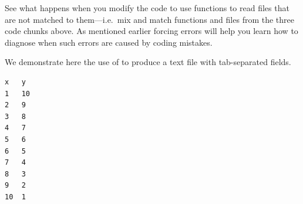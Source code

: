 \documentclass[krantz2]{krantz}\usepackage{knitr}%
\begin{document}
\begin{playground}
See what happens when you modify the code to use  functions to read files that are not matched to them---i.e.\ mix and match functions and files from the three code chunks above. As mentioned earlier forcing errors will help you learn how to diagnose when such errors are caused by coding mistakes.
\end{playground}

We demonstrate here the use of  to produce a text file with tab-separated fields.
\begin{knitrout}\footnotesize
{}\color{fgcolor}\begin{kframe}
\begin{alltt}
  \hlstd{=} \hlstd{)}
\hlstd{(}\hlstd{,}  \hlstd{=} \hlstd{)}
\end{alltt}
\end{kframe}
\end{knitrout}

\begin{knitrout}\footnotesize
{}\color{fgcolor}\begin{kframe}
\begin{verbatim}
x	y
1	10
2	9
3	8
4	7
5	6
6	5
7	4
8	3
9	2
10	1
\end{verbatim}
\end{kframe}
\end{knitrout}
\end{document}
